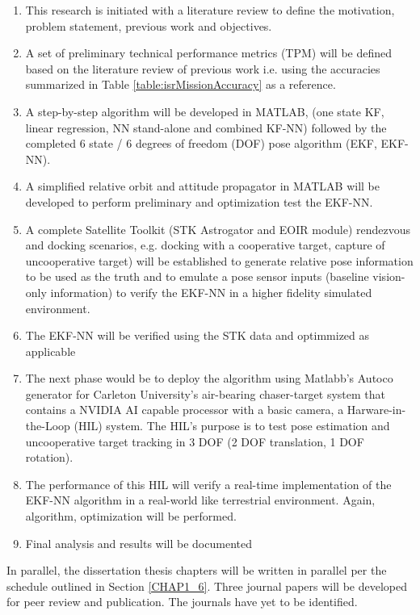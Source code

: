 \begin{enumerate}
    \item This research is initiated with a literature review to define the motivation, problem statement, previous work and objectives. 
    \item A set of preliminary technical performance metrics (TPM) will be defined based on the literature review of previous work i.e. using the accuracies summarized in Table \ref{table:isrMissionAccuracy} as a reference. 
    \item A step-by-step  algorithm will be developed in MATLAB, (one state KF, linear regression, NN stand-alone and combined KF-NN) followed by the completed 6  state / 6 degrees of freedom (DOF) pose algorithm (EKF, EKF-NN). 
    \item A simplified relative orbit and attitude propagator in MATLAB will be developed to perform preliminary and optimization test the EKF-NN. 
    \item A complete Satellite Toolkit (STK Astrogator and EOIR module) rendezvous and docking scenarios, e.g. docking with a cooperative target, capture of uncooperative target) will be established to generate relative pose information to be used as the truth and to emulate a pose sensor inputs (baseline  vision-only information) to verify the EKF-NN in a higher fidelity simulated environment.
    \item The EKF-NN  will be verified using the STK  data and optimmized as applicable
    \item The next phase would be to deploy the algorithm using Matlabb's Autoco generator for Carleton University’s air-bearing chaser-target system that contains a NVIDIA AI capable processor with a basic camera, a Harware-in-the-Loop (HIL) system. The HIL's purpose is to test pose estimation and uncooperative target tracking in 3 DOF (2 DOF translation, 1 DOF rotation).
    \item The performance of this HIL will verify a real-time implementation of the EKF-NN algorithm in a real-world like terrestrial environment. Again, algorithm, optimization will be performed.
    \item Final analysis and results will be documented
\end{enumerate}

In parallel, the dissertation thesis chapters will be written in parallel per the schedule outlined in Section \ref{CHAP1_6}. Three journal papers will be developed for peer review and publication. The journals have yet to be identified. 


